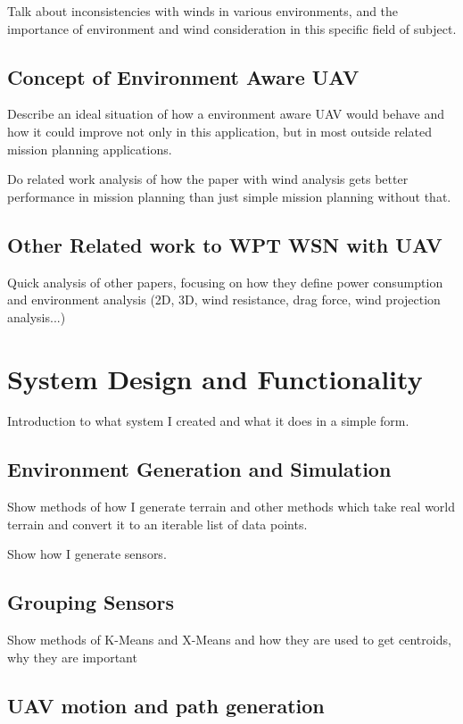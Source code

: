 \documentclass[11pt,a4paper,footinclude=true,headinclude=true, oneside]{scrbook}
\begin{document}
Talk about inconsistencies with winds in various environments, and the importance of environment and wind consideration in this specific field of subject.

\section{Concept of Environment Aware UAV}

Describe an ideal situation of how a environment aware UAV would behave and how it could improve not only in this application, but in most outside related mission planning applications.

Do related work analysis of how the paper with wind analysis gets better performance in mission planning than just simple mission planning without that.

\section{Other Related work to WPT WSN with UAV}

Quick analysis of other papers, focusing on how they define power consumption and environment analysis (2D, 3D, wind resistance, drag force, wind projection analysis...)

\chapter{System Design and Functionality}

Introduction to what system I created and what it does in a simple form.

\section{Environment Generation and Simulation}

Show methods of how I generate terrain and other methods which take real world terrain and convert it to an iterable list of data points.

Show how I generate sensors.

\section{Grouping Sensors}

Show methods of K-Means and X-Means and how they are used to get centroids, why they are important

\section{UAV motion and path generation}
\end{document}
